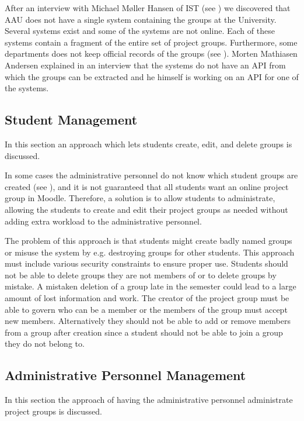 After an interview with Michael Møller Hansen of IST (see ) we discovered that AAU does not have a single system containing the groups at the University.
Several systems exist and some of the systems are not online.
Each of these systems contain a fragment of the entire set of project groups.
Furthermore, some departments does not keep official records of the groups (see ).
Morten Mathiasen Andersen explained in an interview that the systems do not have an API from which the groups can be extracted and he himself is working on an API for one of the systems.





\subsection{Student Management}
\label{sub:studentmangement}
In this section an approach which lets students create, edit, and delete groups is discussed. 

In some cases the administrative personnel do not know which student groups are created (see ), and it is not guaranteed that all students want an online project group in Moodle. 
Therefore, a solution is to allow students to administrate, allowing the students to create and edit their project groups as needed without adding extra workload to the administrative personnel.

The problem of this approach is that students might create badly named groups or misuse the system by e.g. destroying groups for other students. 
This approach must include various security constraints to ensure proper use. 
Students should not be able to delete groups they are not members of or to delete groups by mistake. 
A mistaken deletion of a group late in the semester could lead to a large amount of lost information and work. 
The creator of the project group must be able to govern who can be a member or the members of the group must accept new members.
Alternatively they should not be able to add or remove members from a group after creation since a student should not be able to join a group they do not belong to. 


\subsection{Administrative Personnel Management}
In this section the approach of having the administrative personnel administrate project groups is discussed. 

